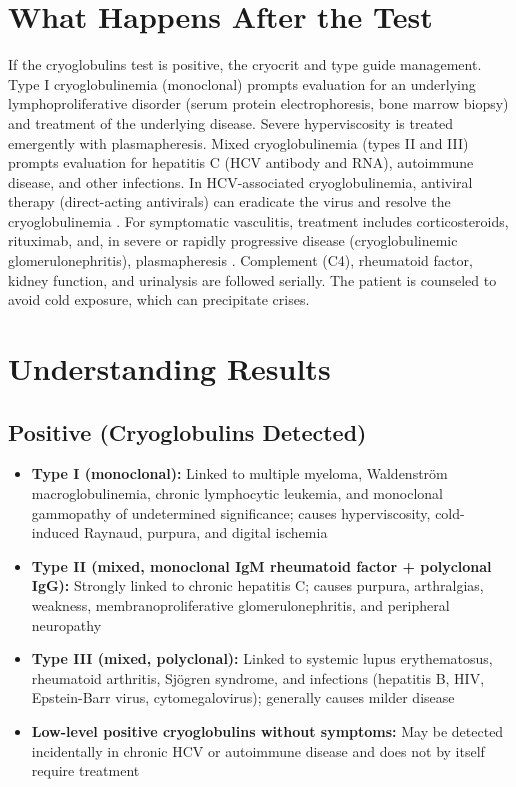 \section*{What Happens After the Test}
If the cryoglobulins test is positive, the cryocrit and type guide management. Type I cryoglobulinemia (monoclonal) prompts evaluation for an underlying lymphoproliferative disorder (serum protein electrophoresis, bone marrow biopsy) and treatment of the underlying disease. Severe hyperviscosity is treated emergently with plasmapheresis. Mixed cryoglobulinemia (types II and III) prompts evaluation for hepatitis C (HCV antibody and RNA), autoimmune disease, and other infections. In HCV-associated cryoglobulinemia, antiviral therapy (direct-acting antivirals) can eradicate the virus and resolve the cryoglobulinemia \cite{gragnani2016prospective}. For symptomatic vasculitis, treatment includes corticosteroids, rituximab, and, in severe or rapidly progressive disease (cryoglobulinemic glomerulonephritis), plasmapheresis \cite{terrier2012management}. Complement (C4), rheumatoid factor, kidney function, and urinalysis are followed serially. The patient is counseled to avoid cold exposure, which can precipitate crises.

\section*{Understanding Results}

\subsection*{Positive (Cryoglobulins Detected)}
\begin{itemize}
  \item \textbf{Type I (monoclonal):} Linked to multiple myeloma, Waldenstr\"om macroglobulinemia, chronic lymphocytic leukemia, and monoclonal gammopathy of undetermined significance; causes hyperviscosity, cold-induced Raynaud, purpura, and digital ischemia
  \item \textbf{Type II (mixed, monoclonal IgM rheumatoid factor + polyclonal IgG):} Strongly linked to chronic hepatitis C; causes purpura, arthralgias, weakness, membranoproliferative glomerulonephritis, and peripheral neuropathy
  \item \textbf{Type III (mixed, polyclonal):} Linked to systemic lupus erythematosus, rheumatoid arthritis, Sj\"ogren syndrome, and infections (hepatitis B, HIV, Epstein-Barr virus, cytomegalovirus); generally causes milder disease
  \item \textbf{Low-level positive cryoglobulins without symptoms:} May be detected incidentally in chronic HCV or autoimmune disease and does not by itself require treatment
\end{itemize}

